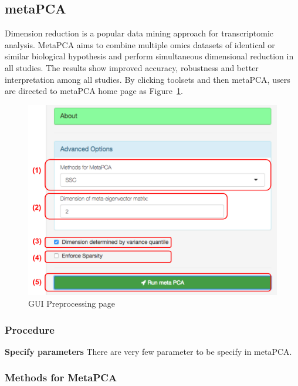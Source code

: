\subsection{metaPCA}
Dimension reduction is a popular data mining approach for transcriptomic analysis.
MetaPCA aims to combine multiple omics datasets of identical or similar biological hypothesis and perform simultaneous dimensional reduction in all studies.
The results show improved accuracy, robustness and better interpretation among all studies.
By clicking toolsets and then metaPCA,
users are directed to metaPCA home page as Figure~\ref{fig:metaPCAHome}.

\begin{figure}[H]
\begin{center}
\includegraphics[scale=0.4]{./figure/metaPCA/metaPCAHome}
\caption{GUI Preprocessing page}
\label{fig:metaPCAHome}
\end{center}
\end{figure}

\subsubsection{Procedure}

\begin{steps}

\item \textbf{Specify parameters} 
There are very few parameter to be specify in metaPCA.

\end{steps}

\subsubsection{Methods for MetaPCA}


